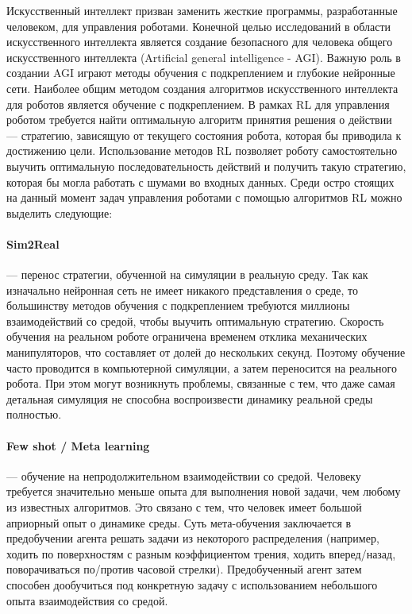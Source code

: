 Искусственный интеллект призван заменить жесткие программы, разработанные человеком, для управления роботами. Конечной целью исследований в области искусственного интеллекта является создание безопасного для человека общего искусственного интеллекта (Artificial general intelligence - AGI). Важную роль в создании AGI играют методы обучения с подкреплением и глубокие нейронные сети. 
Наиболее общим методом создания алгоритмов искусственного интеллекта для роботов является обучение с подкреплением. В рамках RL для управления роботом требуется найти оптимальную алгоритм принятия решения о действии –-- стратегию, зависящую от текущего состояния робота, которая бы приводила к достижению цели. Использование методов RL позволяет роботу самостоятельно выучить оптимальную последовательность действий и получить такую стратегию, которая бы могла работать с шумами во входных данных. Среди остро стоящих на данный момент задач управления роботами с помощью алгоритмов RL можно выделить следующие:

\paragraph{Sim2Real} --- перенос стратегии, обученной на симуляции в реальную среду. Так как изначально нейронная сеть не имеет никакого представления о среде, то большинству методов обучения с подкреплением требуются миллионы взаимодействий со средой, чтобы выучить оптимальную стратегию. Скорость обучения на реальном роботе ограничена временем отклика механических манипуляторов, что составляет от долей до нескольких секунд. Поэтому обучение часто проводится в компьютерной симуляции, а затем переносится на реального робота. При этом могут возникнуть проблемы, связанные с тем, что даже самая детальная симуляция не способна воспроизвести динамику реальной среды полностью. 

\paragraph{Few shot / Meta learning} --- обучение на непродолжительном взаимодействии со средой. Человеку требуется значительно меньше опыта для выполнения новой задачи, чем любому из известных алгоритмов. Это связано с тем, что человек имеет большой априорный опыт о динамике среды. Суть мета-обучения заключается в предобучении агента решать задачи из некоторого распределения (например, ходить по поверхностям с разным коэффициентом трения, ходить вперед/назад, поворачиваться по/против часовой стрелки). Предобученный агент затем способен дообучиться под конкретную задачу с использованием небольшого опыта взаимодействия со средой. 

